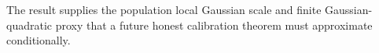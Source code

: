The result supplies the population local Gaussian scale and finite Gaussian-quadratic proxy that a future honest calibration theorem must approximate conditionally.